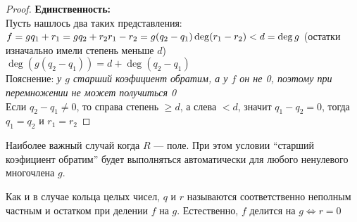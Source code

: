 \begin{normalsize}
\begin{proof}
    \textbf{Единственность:} \\
    Пусть нашлось два таких представления: \\
    $f = gq_1 + r_1 = gq_2 + r_2 \\
    r_1 - r_2 = g(q_2 - q_1) \\
    \deg(r_1 - r_2) < d = \deg g$ (остатки изначально имели степень меньше $d$)\\
    $\deg(g(q_2 - q_1)) = d + \deg(q_2 - q_1)$ \\
    Пояснение: \emph{у $g$ старший коэфициент обратим, а у $f$ он не 0,
    поэтому при перемножении не может получиться 0}\\
    Если $q_2 - q_1 \neq 0$, то справа степень $\geqslant d$, а слева $< d$, значит $q_1 - q_2 = 0$, тогда $q_1 = q_2$ и $r_1 = r_2$
\end{proof}

\notice 
Наиболее важный случай когда $R$ --- поле.
При этом условии ``старший коэфициент обратим'' будет
выполняться автоматически для любого ненулевого многочлена $g$.

\notice
Как и в случае кольца целых чисел, $q$ и $r$ называются соответственно
неполным частным и остатком при делении $f$ на $g$.
Естественно, $f$ делится на $g \Leftrightarrow r = 0$

\end{normalsize}